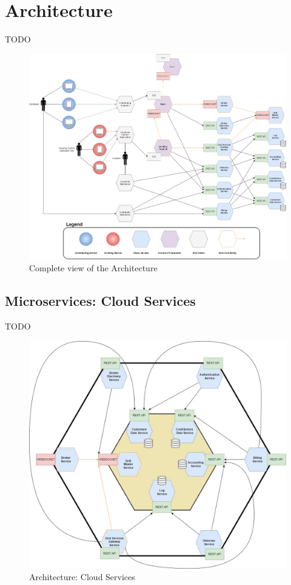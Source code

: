 \section{Architecture}
TODO
\begin{figure}[!ht]
    \centering
    \includegraphics[width=\linewidth]{document/chapters/chapter_6/images/architecture_complete.jpg}
    \caption{Complete view of the Architecture}
    \label{fig:architecture_complete}
\end{figure}

\subsection{Microservices: Cloud Services}
TODO
\begin{figure}[!ht]
    \centering
    \includegraphics[width=\linewidth]{document/chapters/chapter_6/images/architecture_cloud_services.jpg}
    \caption{Architecture: Cloud Services}
    \label{fig:architecture_cloud_services}
\end{figure}

